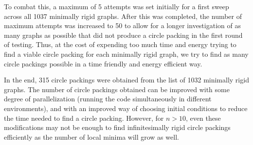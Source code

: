 \begin{flushleft}
To combat this, a maximum of 5 attempts was set initially for a first sweep across all 1037 minimally rigid graphs. After this was completed, the number of maximum attempts was increased to 50 to allow for a longer investigation of as many graphs as possible that did not produce a circle packing in the first round of testing. Thus, at the cost of expending too much time and energy trying to find a viable circle packing for each minimally rigid graph, we try to find as many circle packings possible in a time friendly and energy efficient way.
\end{flushleft}

\begin{flushleft}
In the end, 315 circle packings were obtained from the list of 1032 minimally rigid graphs. The number of circle packings obtained can be improved with some degree of parallelization (running the code simultaneously in different environments), and with an improved way of choosing initial conditions to reduce the time needed to find a circle packing. However, for $n > 10$, even these modifications may not be enough to find infinitesimally rigid circle packings efficiently as the number of local minima will grow as well.
\end{flushleft}
